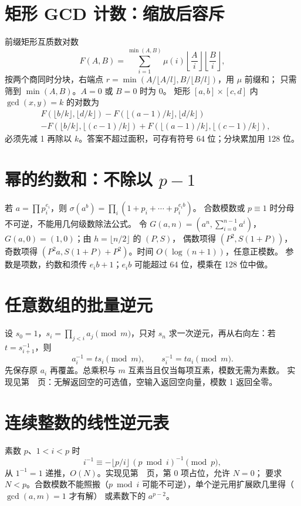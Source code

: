 \section{矩形 GCD 计数：缩放后容斥}\label{knowledge-coprime-rectangles}
前缀矩形互质数对数
\[
F(A,B)=\sum_{i=1}^{\min(A,B)}\mu(i)\left\lfloor\frac Ai\right\rfloor
\left\lfloor\frac Bi\right\rfloor,
\]
按两个商同时分块，右端点 $r=\min(A/\lfloor A/l\rfloor,B/\lfloor B/l\rfloor)$，用 $\mu$ 前缀和；
只需筛到 $\min(A,B)$。$A=0$ 或 $B=0$ 时为 0。
矩形 $[a,b]\times[c,d]$ 内 $\gcd(x,y)=k$ 的对数为
\[
\begin{aligned}
&F(\lfloor b/k\rfloor,\lfloor d/k\rfloor)
-F(\lfloor(a-1)/k\rfloor,\lfloor d/k\rfloor)\\
&-F(\lfloor b/k\rfloor,\lfloor(c-1)/k\rfloor)
+F(\lfloor(a-1)/k\rfloor,\lfloor(c-1)/k\rfloor),
\end{aligned}
\]
必须先减 1 再除以 $k$。答案不超过面积，可存有符号 64 位；分块累加用 128 位。

\section{幂的约数和：不除以 \texorpdfstring{$p-1$}{p-1}}\label{knowledge-divisor-power-sum}
若 $a=\prod p_i^{e_i}$，则 $\sigma(a^b)=\prod_i(1+p_i+\cdots+p_i^{e_i b})$。
合数模数或 $p\equiv1$ 时分母不可逆，不能用几何级数除法公式。
令 $G(a,n)=(a^n,\sum_{i=0}^{n-1}a^i)$，$G(a,0)=(1,0)$；由 $h=\lfloor n/2\rfloor$ 的 $(P,S)$，
偶数项得 $(P^2,S(1+P))$，奇数项得 $(P^2a,S(1+P)+P^2)$。时间 $O(\log(n+1))$，任意正模数。
参数是项数，约数和须传 $e_ib+1$；$e_ib$ 可能超过 64 位，模乘在 128 位中做。

\section{任意数组的批量逆元}\label{knowledge-batch-inverse}
设 $s_0=1$，$s_i=\prod_{j<i}a_j\pmod m$，只对 $s_n$ 求一次逆元，再从右向左：若 $t=s_{i+1}^{-1}$，则
\[
a_i^{-1}=t s_i\pmod m,\qquad s_i^{-1}=t a_i\pmod m.
\]
先保存原 $a_i$ 再覆盖。总乘积与 $m$ 互素当且仅当每项互素，模数无需为素数。
实现见第~\pageref{compact-batch_inverse}~页：无解返回空的可选值，空输入返回空向量，模数 1 返回全零。

\section{连续整数的线性逆元表}\label{knowledge-linear-inverses}
素数 $p$、$1<i<p$ 时
\[
i^{-1}\equiv-\lfloor p/i\rfloor\,(p\bmod i)^{-1}\pmod p,
\]
从 $1^{-1}=1$ 递推，$O(N)$。实现见第~\pageref{compact-inverse_table}~页，第 0 项占位，允许 $N=0$；
要求 $N<p$。合数模数不能照搬（$p\bmod i$ 可能不可逆），单个逆元用扩展欧几里得（$\gcd(a,m)=1$ 才有解）
或素数下的 $a^{p-2}$。


